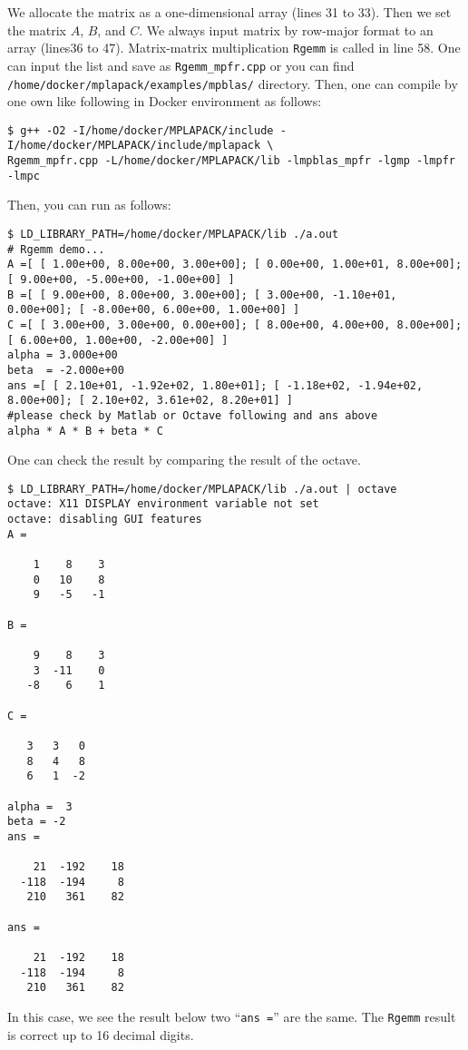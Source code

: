 \documentclass[12pt]{article}
\begin{document}
We allocate the matrix as a one-dimensional array (lines 31 to 33). Then we set the matrix $A$, $B$, and $C$. We always input matrix by row-major format to an array (lines36 to 47). Matrix-matrix multiplication {\tt Rgemm} is called in line 58. 
One can input the list and save as {\tt Rgemm\_mpfr.cpp} or you can find {\tt /home/docker/mplapack/examples/mpblas/} directory.
Then, one can compile by one own like following in Docker environment as follows:
\begin{verbatim}
$ g++ -O2 -I/home/docker/MPLAPACK/include -I/home/docker/MPLAPACK/include/mplapack \
Rgemm_mpfr.cpp -L/home/docker/MPLAPACK/lib -lmpblas_mpfr -lgmp -lmpfr -lmpc
\end{verbatim}
Then, you can run as follows:
{\fontsize{9.5pt}{0.4cm}\selectfont
\begin{verbatim}
$ LD_LIBRARY_PATH=/home/docker/MPLAPACK/lib ./a.out
# Rgemm demo...
A =[ [ 1.00e+00, 8.00e+00, 3.00e+00]; [ 0.00e+00, 1.00e+01, 8.00e+00]; [ 9.00e+00, -5.00e+00, -1.00e+00] ]
B =[ [ 9.00e+00, 8.00e+00, 3.00e+00]; [ 3.00e+00, -1.10e+01, 0.00e+00]; [ -8.00e+00, 6.00e+00, 1.00e+00] ]
C =[ [ 3.00e+00, 3.00e+00, 0.00e+00]; [ 8.00e+00, 4.00e+00, 8.00e+00]; [ 6.00e+00, 1.00e+00, -2.00e+00] ]
alpha = 3.000e+00
beta  = -2.000e+00
ans =[ [ 2.10e+01, -1.92e+02, 1.80e+01]; [ -1.18e+02, -1.94e+02, 8.00e+00]; [ 2.10e+02, 3.61e+02, 8.20e+01] ]
#please check by Matlab or Octave following and ans above
alpha * A * B + beta * C
\end{verbatim}
}
One can check the result by comparing the result of the octave.
{\footnotesize
\begin{verbatim}
$ LD_LIBRARY_PATH=/home/docker/MPLAPACK/lib ./a.out | octave
octave: X11 DISPLAY environment variable not set
octave: disabling GUI features
A =

    1    8    3
    0   10    8
    9   -5   -1

B =

    9    8    3
    3  -11    0
   -8    6    1

C =

   3   3   0
   8   4   8
   6   1  -2

alpha =  3
beta = -2
ans =

    21  -192    18
  -118  -194     8
   210   361    82

ans =

    21  -192    18
  -118  -194     8
   210   361    82
\end{verbatim}
}
In this case, we see the result below two ``{\tt ans =}'' are the same. The {\tt Rgemm} result is correct up to 16 decimal digits.
\end{document}
